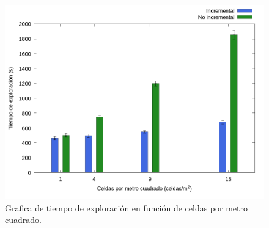 






\begin{figure}[H]
  \centerfloat

  \includegraphics[clip=true, width=\graphlen]{imagenes/graficas_chicas/graficas_histo_num/incrementalidad/exploration_time.png}

  \caption{Grafica de tiempo de exploración en función de celdas por metro cuadrado.}\label{fig:gra:inc:et}

\end{figure}

